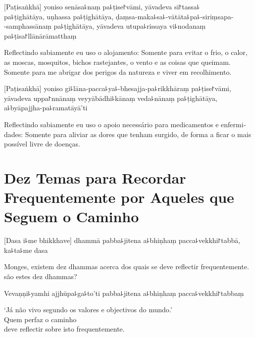 \documentclass[
  babelLanguage=english,
  final,
  webversion,
]{chantingbook}
\begin{document}
[Paṭisaṅkhā] yoniso senāsa꜕naṃ pa꜕ṭise꜓vāmi, yāvadeva sī꜓tassa꜕\\
pa꜕ṭighātāya, uṇhassa pa꜕ṭighātāya, ḍaṃsa-maka꜕sa꜕-vātāta꜕pa꜕-siriṃsapa-\\
-samphassānaṃ pa꜕ṭighātāya, yāvadeva utupa꜕rissaya vi꜕nodanaṃ pa꜕ṭisa꜓llānārāmatthaṃ

\begin{english}
  Reflectindo sabiamente eu uso o alojamento: Somente para evitar o frio, o calor,
  as moscas, mosquitos, bichos rastejantes, o vento e as coisas que
  queimam. Somente para me abrigar dos perigos da natureza e viver em
  recolhimento.
\end{english}

[Paṭisaṅkhā] yoniso gi꜕lāna-pacca꜕ya꜕-bhesajja-pa꜕rikkhāraṃ pa꜕ṭise꜓vāmi, yāvadeva uppa꜓nnānaṃ veyyābādhi꜕kānaṃ veda꜕nānaṃ pa꜕ṭighātāya, a꜕byāpajjha-pa꜕ramatāyā'ti

\begin{english}
  Reflectindo sabiamente eu uso o apoio necessário para medicamentos e
  enfermidades: Somente para aliviar as dores que tenham surgido, de forma a
  ficar o mais possível livre de doenças.
\end{english}

\chapter[Dez Temas]{Dez Temas para Recordar Frequentemente por Aqueles que Seguem o Caminho}


\enlargethispage{\baselineskip}

\begin{leader}
\end{leader}

[Dasa i꜕me bhikkhave] dhammā pabba꜕jitena a꜕bhiṇhaṃ pacca꜕vekkhi꜓tabbā, ka꜕ta꜕me dasa

\begin{english}
  Monges, existem dez dhammas acerca dos quais se deve reflectir frequentemente.  são estes dez dhammas?
\end{english}

Vevaṇṇi꜕yamhi ajjhūpa꜕ga꜕to'ti pabba꜕jitena a꜕bhiṇhaṃ pacca꜕vekkhi꜓tabbaṃ

\begin{english}
  `Já não vivo segundo os valores e objectivos do mundo.'\\
  Quem perfaz o caminho\\
  deve reflectir sobre isto frequentemente.
\end{english}
\end{document}

